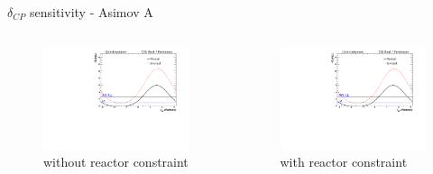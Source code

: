 \documentclass{beamer}
\newcommand{\deltacp}{$\delta_{CP}$\xspace}
\begin{document}
\begin{frame}{\deltacp sensitivity - Asimov A}
	\centering
	\begin{columns}
		\begin{column}{0.5\paperwidth}
			\begin{figure}
				\includegraphics[trim={0cm 0cm 0cm 0cm}, clip, scale=0.33] {images/sensitivity/dcp_global_t2k}
				\caption*{without reactor constraint}
			\end{figure}
		\end{column}
		\begin{column}{0.5\paperwidth}
			\begin{figure}
				\includegraphics[trim={0cm 0cm 0cm 0cm}, clip, scale=0.33] {images/sensitivity/dcp_global_t2k}
				\caption*{with reactor constraint}
			\end{figure}
		\end{column}
	\end{columns}
\end{frame}
\end{document}
